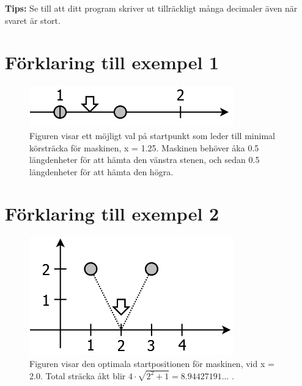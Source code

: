{\bf Tips:} Se till att ditt program skriver ut tillräckligt många decimaler även när svaret är stort.

\section*{Förklaring till exempel 1}

\begin{figure}[!h]
\begin{center}
\includegraphics[scale=0.4]{stenar1.png}
\end{center}
\caption{Figuren visar ett möjligt val på startpunkt som leder till minimal körsträcka för maskinen, x = 1.25. Maskinen behöver åka 0.5 längdenheter för att hämta den vänstra stenen, och sedan 0.5 längdenheter för att hämta den högra.}
\label{fig1}
\end{figure}

\section*{Förklaring till exempel 2}
\begin{figure}[!h]
\begin{center}
\includegraphics[scale=0.4]{stenar2.png}
\end{center}
\caption{Figuren visar den optimala startpositionen för maskinen, vid x = 2.0. Total sträcka åkt blir $4\cdot\sqrt{2^2 + 1} = 8.94427191...$ .}
\label{fig1}
\end{figure}
